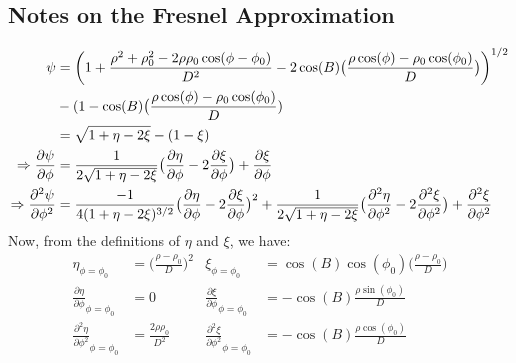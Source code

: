 \documentclass[crop=false,class=book,oneside]{standalone}
\begin{document}
        \subsection{Notes on the Fresnel Approximation}
            \begin{align*}
                \psi
                &=\bigg(
                      1+\frac{%
                          \rho^{2}+\rho_{0}^{2}
                          -2\rho\rho_{0}\cos(\phi-\phi_{0})
                      }{D^{2}}
                      -2\cos(B)\big(
                          \frac{%
                              \rho\cos(\phi)
                              -\rho_{0}\cos(\phi_{0})
                          }{D}
                      \big)
                  \bigg)^{1/2}\\
                &-(1-\cos(B)\big(\frac{\rho\cos(\phi)-\rho_{0}
                  \cos(\phi_{0})}{D})\\
                &=\sqrt{1+\eta-2\xi}-(1-\xi)\\
                  \Rightarrow\frac{\partial\psi}{\partial\phi}
                &=\frac{1}{2\sqrt{1+\eta-2\xi}}
                  \big(
                      \frac{\partial\eta}{\partial\phi}
                      -2\frac{\partial\xi}{\partial\phi}
                  \big)+\frac{\partial\xi}{\partial\phi}\\
                \Rightarrow
                \frac{\partial^{2}\psi}{\partial\phi^{2}}
                &=\frac{-1}{4(1+\eta-2\xi)^{3/2}}
                  \big(
                      \frac{\partial\eta}{\partial\phi}
                      -2\frac{\partial\xi}{\partial\phi}
                  \big)^{2}
                      +\frac{1}{2\sqrt{1+\eta-2\xi}}
                  \big(
                      \frac{\partial^{2}\eta}{\partial\phi^{2}}
                      -2\frac{\partial^{2}\xi}{\partial\phi^{2}}
                  \big)
                +\frac{\partial^{2}\xi}{\partial\phi^{2}}
            \end{align*}
            Now, from the definitions of $\eta$ and $\xi$,
            we have:
            \begin{align*}
                \eta_{\phi=\phi_{0}}
                &=\big(\frac{\rho-\rho_{0}}{D}\big)^{2}
                &
                \xi_{\phi=\phi_{0}}
                &=\cos(B)\cos(\phi_{0})
                  \big(\frac{\rho-\rho_{0}}{D}\big)\\
                \frac{\partial\eta}
                     {\partial\phi}_{\phi=\phi_{0}}
                &=0
                &
                \frac{\partial\xi}
                     {\partial\phi}_{\phi=\phi_{0}}
                &=-\cos(B)\frac{\rho\sin(\phi_{0})}{D}\\
                \frac{\partial^{2}\eta}
                     {\partial\phi^{2}}_{\phi=\phi_{0}}
                &=\frac{2\rho\rho_{0}}{D^{2}}
                &
                \frac{\partial^{2}\xi}
                     {\partial\phi^{2}}_{\phi=\phi_{0}}
                &=-\cos(B)\frac{\rho\cos(\phi_{0})}{D}
            \end{align*}
\end{document}
